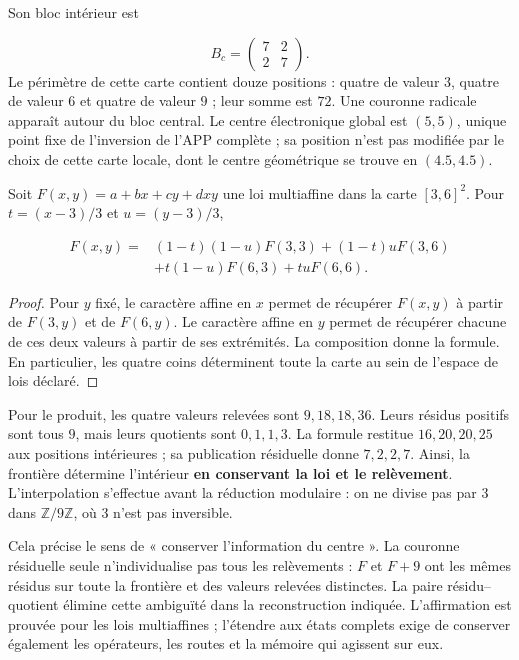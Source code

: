 

Son bloc intérieur est

\[
B_c=\begin{pmatrix}7&2\\2&7\end{pmatrix}.
\]
Le périmètre de cette carte contient douze positions : quatre de valeur \(3\), quatre de valeur \(6\) et quatre de valeur \(9\) ; leur somme est \(72\). Une couronne radicale apparaît autour du bloc central. Le centre électronique global est \((5,5)\), unique point fixe de l'inversion de l'APP complète ; sa position n'est pas modifiée par le choix de cette carte locale, dont le centre géométrique se trouve en \((4.5,4.5)\).

\begin{proposition}
\label{viii:prop:centro-frontera-recuperacion}
Soit \(F(x,y)=a+bx+cy+dxy\) une loi multiaffine dans la carte \([3,6]^2\). Pour \(t=(x-3)/3\) et \(u=(y-3)/3\),

\[
\begin{aligned}
F(x,y)={}&(1-t)(1-u)F(3,3)+(1-t)uF(3,6)\\
&+t(1-u)F(6,3)+tuF(6,6).
\end{aligned}
\]
\end{proposition}
\begin{proof}
Pour \(y\) fixé, le caractère affine en \(x\) permet de récupérer \(F(x,y)\) à partir de \(F(3,y)\) et de \(F(6,y)\). Le caractère affine en \(y\) permet de récupérer chacune de ces deux valeurs à partir de ses extrémités. La composition donne la formule. En particulier, les quatre coins déterminent toute la carte au sein de l'espace de lois déclaré.
\end{proof}

Pour le produit, les quatre valeurs relevées sont \(9,18,18,36\). Leurs résidus positifs sont tous \(9\), mais leurs quotients sont \(0,1,1,3\). La formule restitue \(16,20,20,25\) aux positions intérieures ; sa publication résiduelle donne \(7,2,2,7\). Ainsi, la frontière détermine l'intérieur \textbf{en conservant la loi et le relèvement}. L'interpolation s'effectue avant la réduction modulaire : on ne divise pas par \(3\) dans \(\mathbb Z/9\mathbb Z\), où \(3\) n'est pas inversible.

Cela précise le sens de « conserver l'information du centre ». La couronne résiduelle seule n'individualise pas tous les relèvements : \(F\) et \(F+9\) ont les mêmes résidus sur toute la frontière et des valeurs relevées distinctes. La paire résidu–quotient élimine cette ambiguïté dans la reconstruction indiquée. L'affirmation est prouvée pour les lois multiaffines ; l'étendre aux états complets exige de conserver également les opérateurs, les routes et la mémoire qui agissent sur eux.

